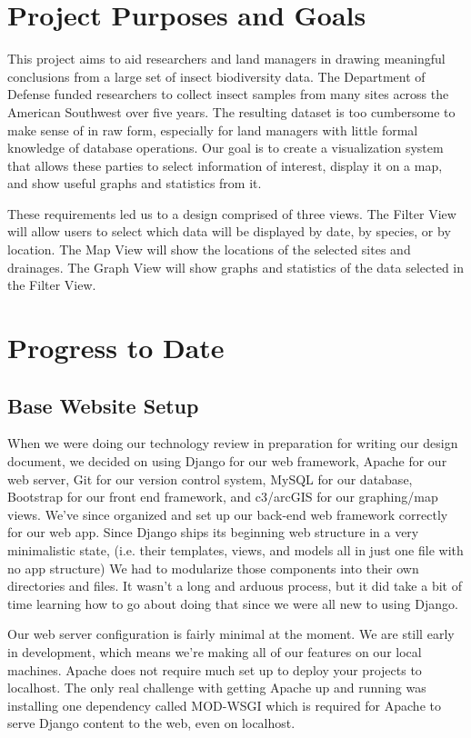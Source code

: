 \documentclass[10pt,peerreview,onecolumn,draftclsnofoot,technote]{IEEEtran}
\begin{document}
\section{Project Purposes and Goals} %
This project aims to aid researchers and land managers in drawing meaningful
conclusions from a large set of insect biodiversity data. The Department of
Defense funded researchers to collect insect samples from many sites across the
American Southwest over five years. The resulting dataset is too cumbersome to
make sense of in raw form, especially for land managers with little formal
knowledge of database operations. Our goal is to create a visualization system
that allows these parties to select information of interest, display it on a
map, and show useful graphs and statistics from it.


These requirements led us to a design comprised of three views. The Filter
View will allow users to select which data will be displayed by date, by
species, or by location. The Map View will show the locations of the selected
sites and drainages. The Graph View will show graphs and statistics of the data
selected in the Filter View.


\section{Progress to Date}

\subsection{Base Website Setup} %
When we were doing our technology review in preparation for writing our design document, we decided on using Django for our web framework, Apache for our web server, Git for our version control system, MySQL for our database, Bootstrap for our front end framework, and c3/arcGIS for our graphing/map views.
We’ve since organized and set up our back-end web framework correctly for our web app.
Since Django ships its beginning web structure in a very minimalistic state, (i.e. their templates, views, and models all in just one file with no app structure) We had to modularize those components into their own directories and files.
It wasn’t a long and arduous process, but it did take a bit of time learning how to go about doing that since we were all new to using Django.

Our web server configuration is fairly minimal at the moment.
We are still early in development, which means we’re making all of our features on our local machines.
Apache does not require much set up to deploy your projects to localhost.
The only real challenge with getting Apache up and running was installing one dependency called MOD-WSGI which is required for Apache to serve Django content to the web, even on localhost.
\end{document}
